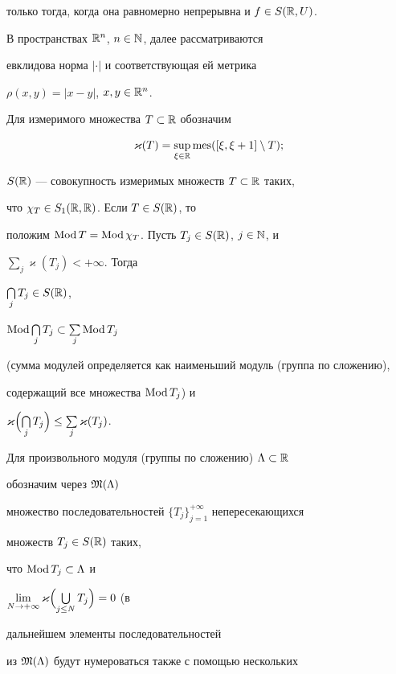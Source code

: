 только тогда, когда она равномерно непрерывна и $f\in S(\Bbb R,U)$.





В пространствах $\Bbb R^n$, $n\in\Bbb N$, далее рассматриваются


евклидова норма $|\cdot|$ и соответствующая ей метрика


$\rho(x,y)=|x-y|$, $x,y\in\Bbb R^n$.





Для измеримого множества $T\subset\Bbb R$ обозначим


$$


\varkappa(T)=\sup_{\xi\in\Bbb R}\mes([\xi,\xi+1]\setminus T);


$$


$S(\Bbb R)$ --- совокупность измеримых множеств $T\subset\Bbb R$ таких,


что $\chi_T\in S_1(\Bbb R,\Bbb R)$. Если $T\in S(\Bbb R)$, то


положим $\operatorname{Mod} T=\operatorname{Mod}\chi_T$. Пусть $T_j\in S(\Bbb R)$, $j\in\Bbb N$, и


$\sum\limits_j\varkappa(T_j)<+\infty$. Тогда


$\bigcap\limits_j T_j\in S(\Bbb R)$,


$\operatorname{Mod}\bigcap\limits_j T_j\subset\sum\limits_j\operatorname{Mod} T_j$


(сумма модулей определяется как наименьший модуль (группа по сложению),


содержащий все множества $\operatorname{Mod} T_j$) и


$\varkappa\Bigl(\bigcap\limits_j T_j\Bigr)\le


\sum\limits_j\varkappa(T_j)$.





Для произвольного модуля (группы по сложению) $\Lambda\subset\Bbb R$


обозначим через $\frak M(\Lambda)$


множество последовательностей $\{T_j\}^{+\infty}_{j=1}$ непересекающихся


множеств $T_j\in S(\Bbb R)$ таких,


что $\operatorname{Mod} T_j\subset\Lambda$ и


$\lim\limits_{N\to+\infty}\varkappa\Bigl(\bigcup\limits_{j\le N}


T_j\Bigr)=0$ (в


дальнейшем элементы последовательностей


из $\frak M(\Lambda)$ будут нумероваться также с помощью нескольких


